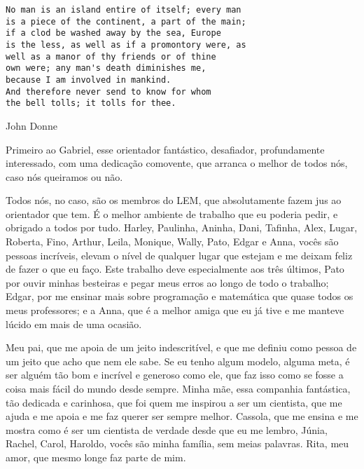 \newpage

\vspace*{0.4\textheight}
\begin{verbatim}
No man is an island entire of itself; every man 
is a piece of the continent, a part of the main; 
if a clod be washed away by the sea, Europe 
is the less, as well as if a promontory were, as 
well as a manor of thy friends or of thine 
own were; any man's death diminishes me, 
because I am involved in mankind. 
And therefore never send to know for whom 
the bell tolls; it tolls for thee.
\end{verbatim}
\begin{flushright}
John Donne
\end{flushright}

\newpage


\doublespacing

\vspace{10pt}


Primeiro ao Gabriel, esse orientador fantástico, desafiador,
profundamente interessado, com uma dedicação comovente, que arranca o
melhor de todos nós, caso nós queiramos ou não. 

Todos nós, no caso, são os membros do LEM, que absolutamente fazem jus
ao orientador que tem.
É o melhor ambiente de trabalho que eu poderia pedir, e obrigado a todos
por tudo. 
Harley, Paulinha, Aninha, Dani, Tafinha, Alex, Lugar, Roberta, Fino,
Arthur, Leila, Monique, Wally, Pato, Edgar e Anna, vocês são pessoas
incríveis, elevam o nível de qualquer lugar que estejam e me deixam
feliz de fazer o que eu faço. 
Este trabalho deve especialmente aos três últimos, Pato por ouvir minhas
besteiras e pegar meus erros ao longo de todo o trabalho; Edgar, por me
ensinar mais sobre programação e matemática que quase todos os meus
professores; e a Anna, que é a melhor amiga que eu já tive e me manteve
lúcido em mais de uma ocasião.

Meu pai, que me apoia de um jeito indescritível, e que me definiu como
pessoa de um jeito que acho que nem ele sabe. 
Se eu tenho algum modelo, alguma meta, é ser alguém tão bom e incrível
e generoso como ele, que faz isso como se fosse a coisa mais fácil do
mundo desde sempre.
Minha mãe, essa companhia fantástica, tão dedicada e carinhosa, que foi
quem me inspirou a ser um cientista, que me ajuda e me apoia e me faz
querer ser sempre melhor.
Cassola, que me ensina e me mostra como é ser um cientista de verdade
desde que eu me lembro, 
Júnia, Rachel, Carol, Haroldo, vocês são minha família, sem meias
palavras.
Rita, meu amor, que mesmo longe faz parte de mim. 


